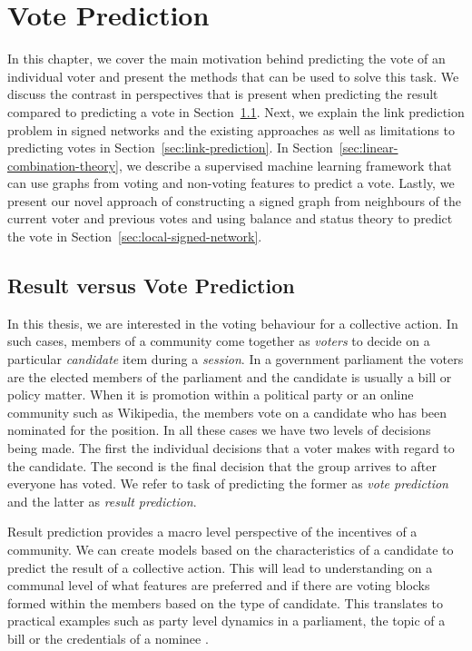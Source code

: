 \chapter{Vote Prediction}
\label{chp:vote-prediction}
In this chapter, we cover the main motivation behind predicting the vote of an individual voter and present the methods that can be used to solve this task. We discuss the contrast in perspectives that is present when predicting the result compared to predicting a vote in Section~\ref{sec:result-vs-vote}. Next, we explain the link prediction problem in signed networks and the existing approaches as well as limitations to predicting votes in Section~\ref{sec:link-prediction}. In Section~\ref{sec:linear-combination-theory}, we describe a supervised machine learning framework that can use graphs from voting and non-voting features to predict a vote. Lastly, we present our novel approach of constructing a signed graph from neighbours of the current voter and previous votes and using balance and status theory to predict the vote in Section~\ref{sec:local-signed-network}. 


\section{Result versus Vote Prediction}
\label{sec:result-vs-vote}
In this thesis, we are interested in the voting behaviour for a collective action. In such cases, members of a community come together as \textit{voters} to decide on a particular \textit{candidate} item during a \textit{session}. In a government parliament  the voters are the elected members of the parliament and the candidate is usually a bill or policy matter. When it is promotion within a political party or an online community such as Wikipedia, the members vote on a candidate who has been nominated for the position. In all these cases we have two levels of decisions being made. The first the individual decisions that a voter makes with regard to the candidate. The second is the final decision that the group arrives to after everyone has voted. We refer to task of predicting the former as \textit{vote prediction} and the latter as \textit{result prediction}. 

Result prediction provides a macro level perspective of the incentives of a community. We can create models based on the characteristics of a candidate to predict the result of a collective action. This will lead to understanding on a communal level of what features are preferred and if there are voting blocks formed within the members based on the type of candidate. This translates to practical examples such as party level dynamics in a parliament, the topic of a bill or the credentials of a nominee \cite{burke2008mopping,yano2012textual,yogatama-etal-2011-predicting}. 

